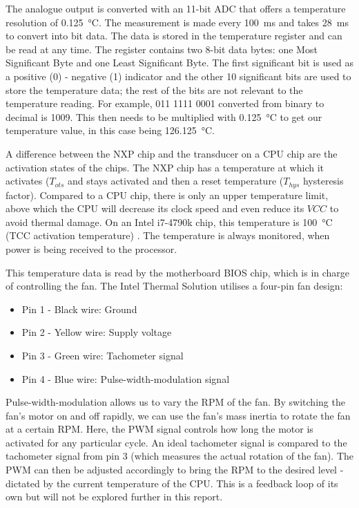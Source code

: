 \documentclass[conference]{IEEEtran}
\begin{document}
The analogue output is converted with an 11-bit ADC that offers a temperature resolution of \SI{0.125}{\celsius}. The measurement is made every \SI{100}{\milli\second} and takes \SI{28}{\milli\second} to convert into bit data. The data is stored in the temperature register and can be read at any time. The register contains two 8-bit data bytes: one Most Significant Byte and one Least Significant Byte. The first significant bit is used as a positive (0) - negative (1) indicator and the other 10 significant bits are used to store the temperature data; the rest of the bits are not relevant to the temperature reading. For example, 011 1111 0001 converted from binary to decimal is 1009. This then needs to be multiplied with \SI{0.125}{\celsius} to get our temperature value, in this case being \SI{126.125}{\celsius}.

A difference between the NXP chip and the transducer on a CPU chip are the activation states of the chips. The NXP chip has a temperature at which it activates ($T_{ots}$ and stays activated and then a reset temperature ($T_{hys}$ hysteresis factor). Compared to a CPU chip, there is only an upper temperature limit, above which the CPU will decrease its clock speed and even reduce its $VCC$ to avoid thermal damage. On an Intel i7-4790k chip, this temperature is \SI{100}{\celsius} (TCC activation temperature) \cite{b4}. The temperature is always monitored, when power is being received to the processor.

This temperature data is read by the motherboard BIOS chip, which is in charge of controlling the fan. The Intel Thermal Solution utilises a four-pin fan design: 
\begin{itemize}
    \item Pin 1 - Black wire: Ground
    \item Pin 2 - Yellow wire: Supply voltage
    \item Pin 3 - Green wire: Tachometer signal
    \item Pin 4 - Blue wire: Pulse-width-modulation signal
\end{itemize}
Pulse-width-modulation allows us to vary the RPM of the fan. By switching the fan's motor on and off rapidly, we can use the fan's mass inertia to rotate the fan at a certain RPM. Here, the PWM signal controls how long the motor is activated for any particular cycle. An ideal tachometer signal is compared to the tachometer signal from pin 3 (which measures the actual rotation of the fan). The PWM can then be adjusted accordingly to bring the RPM to the desired level - dictated by the current temperature of the CPU. This is a feedback loop of its own but will not be explored further in this report. 
\end{document}
